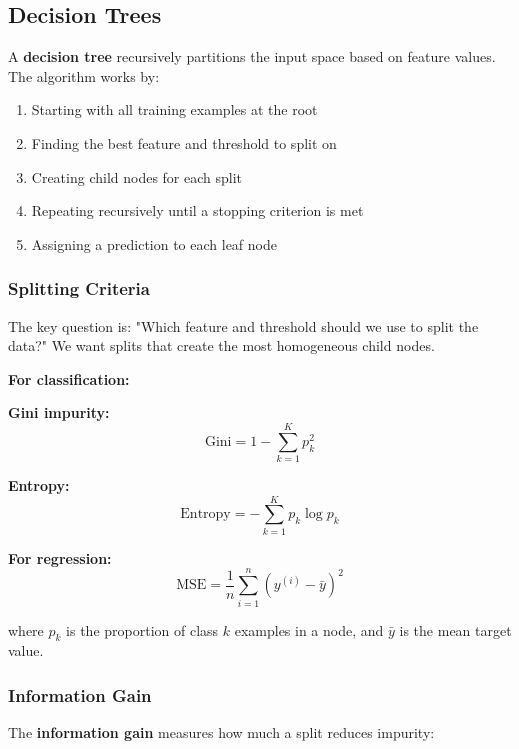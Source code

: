 \subsection{Decision Trees}

A \textbf{decision tree} recursively partitions the input space based on feature values. The algorithm works by:

\begin{enumerate}
    \item Starting with all training examples at the root
    \item Finding the best feature and threshold to split on
    \item Creating child nodes for each split
    \item Repeating recursively until a stopping criterion is met
    \item Assigning a prediction to each leaf node
\end{enumerate}

\subsubsection{Splitting Criteria}

The key question is: "Which feature and threshold should we use to split the data?" We want splits that create the most homogeneous child nodes.

\textbf{For classification:}

\textbf{Gini impurity:}
\begin{equation}
\text{Gini} = 1 - \sum_{k=1}^{K} p_k^2
\end{equation}

\textbf{Entropy:}
\begin{equation}
\text{Entropy} = -\sum_{k=1}^{K} p_k \log p_k
\end{equation}

\textbf{For regression:}
\begin{equation}
\text{MSE} = \frac{1}{n} \sum_{i=1}^{n} (y^{(i)} - \bar{y})^2
\end{equation}

where $p_k$ is the proportion of class $k$ examples in a node, and $\bar{y}$ is the mean target value.

\subsubsection{Information Gain}

The \textbf{information gain} measures how much a split reduces impurity:

